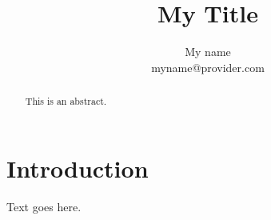 \documentclass[11pt, letterpaper]{article}
\begin{document}
\title{My Title}

\author{My name\\myname@provider.com}

\maketitle

\begin{abstract}

This is an abstract.

\end{abstract}

\section{Introduction}

Text goes here.

%
%
\end{document}
